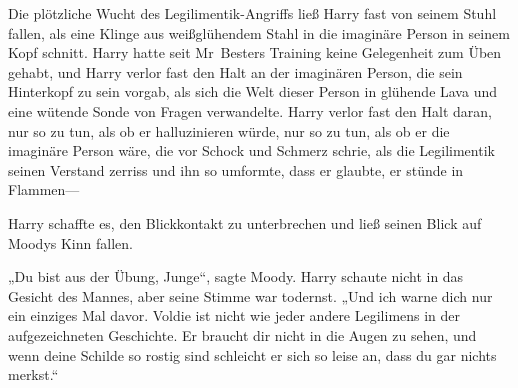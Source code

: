 Die plötzliche Wucht des Legilimentik-Angriffs ließ Harry fast von seinem Stuhl fallen, als eine Klinge aus weißglühendem Stahl in die imaginäre Person in seinem Kopf schnitt. Harry hatte seit Mr~Besters Training keine Gelegenheit zum Üben gehabt, und Harry verlor fast den Halt an der imaginären Person, die sein Hinterkopf zu sein vorgab, als sich die Welt dieser Person in glühende Lava und eine wütende Sonde von Fragen verwandelte. Harry verlor fast den Halt daran, nur so zu tun, als ob er halluzinieren würde, nur so zu tun, als ob er die imaginäre Person wäre, die vor Schock und Schmerz schrie, als die Legilimentik seinen Verstand zerriss und ihn so umformte, dass er glaubte, er stünde in Flammen—

Harry schaffte es, den Blickkontakt zu unterbrechen und ließ seinen Blick auf Moodys Kinn fallen.

„Du bist aus der Übung, Junge“, sagte Moody.
Harry schaute nicht in das Gesicht des Mannes, aber seine Stimme war todernst. „Und ich warne dich nur ein einziges Mal davor. Voldie ist nicht wie jeder andere Legilimens in der aufgezeichneten Geschichte. Er braucht dir nicht in die Augen zu sehen, und wenn deine Schilde so rostig sind schleicht er sich so leise an, dass du gar nichts merkst.“

